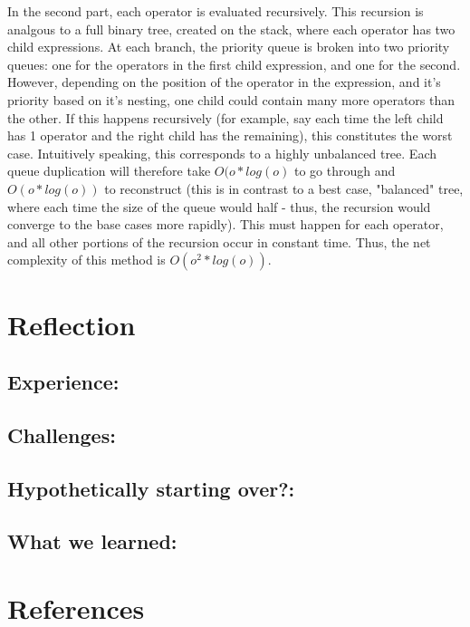 \documentclass[11pt]{article}
\begin{document}
In the second part, each operator is evaluated recursively.
This recursion is analgous to a full binary tree, created on the stack, where each operator has two child expressions.
At each branch, the priority queue is broken into two priority queues: one for the operators in the first child expression, and one for the second.
However, depending on the position of the operator in the expression, and it's priority based on it's nesting, one child could contain many more operators than the other.
If this happens recursively (for example, say each time the left child has 1 operator and the right child has the remaining), this constitutes the worst case.
Intuitively speaking, this corresponds to a highly unbalanced tree.
Each queue duplication will therefore take $O(o*log(o)$ to go through and $O(o*log(o))$ to reconstruct (this is in contrast to a best case, "balanced" tree, where each time the size of the queue would half - thus, the recursion would converge to the base cases more rapidly).
This must happen for each operator, and all other portions of the recursion occur in constant time.
Thus, the net complexity of this method is $O(o^2*log(o))$.

\section*{Reflection}

\subsection*{Experience:}

\subsection*{Challenges:}

\subsection*{Hypothetically starting over?:}

\subsection*{What we learned:}

\section*{References}
\end{document}
